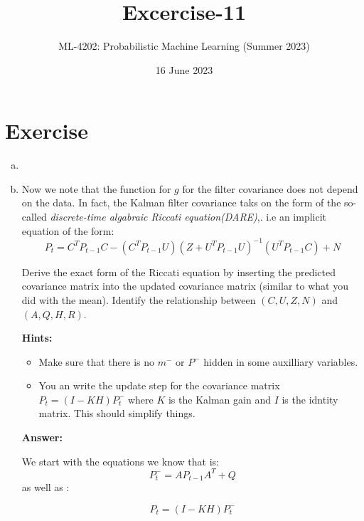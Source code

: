 \documentclass{tufte-handout}
\title{Excercise-11}
\author[ Batuhan, Oezcoemlekci(Matrikelnummer: 6300476) and Aakarsh, Nair( Matrikelnummer: 6546577)]{ML-4202: Probabilistic Machine Learning (Summer 2023)}
\date{16 June 2023}
\begin{document}
\maketitle%

\section{Exercise}

\begin{enumerate}[(a)]
    \item 
    
    \item Now we note that the function for $g$  for the filter covariance does not depend on the data. In fact, the Kalman filter covariance taks on the form of the so-called \emph{discrete-time algabraic Riccati equation(DARE)},. i.e an implicit equation of the form: 
    \begin{equation*}
        P_t = C^TP_{t-1}C - (C^T P_{t-1}U)(Z + U^TP_{t-1}U)^{-1}(U^TP_{t-1}C) + N
    \end{equation*}

    Derive the exact form of the Riccati equation by inserting the 
    predicted covariance matrix into the updated covariance matrix (similar to what you did with the mean). Identify the relationship
    between $(C, U, Z, N)$ and $(A, Q, H, R)$.

    
    \textbf{Hints:}
    \begin{itemize}
        \item Make sure that there is no $m^{-}$  or $P^{-}$ hidden in some auxilliary variables.
        \item You an write the update step for the covariance matrix $P_t = (I  - KH)P_t^{-}$ where $K$ is the Kalman gain and $I$ is the  idntity matrix. This should simplify things.
    \end{itemize}

    \textbf{Answer:}

   We start with the equations we know that is:
   \begin{equation}
        P_t^{-} = AP_{t-1}A^T + Q
        \label{predict-step}
   \end{equation}
   as well as :
   
   \begin{equation}
      P_t  = (I  - KH)P_t^{-}
      \label{update-step}
   \end{equation}


\end{enumerate}
\end{document}

